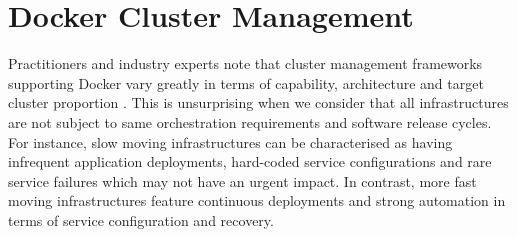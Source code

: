 \documentclass{article}
\begin{document}
\section{Docker Cluster Management}
Practitioners and industry experts note that cluster management frameworks supporting Docker
vary greatly in terms of capability, architecture and target cluster proportion
\citep{goasguen, holla}. This is unsurprising when we consider that all infrastructures 
are not subject to same orchestration requirements and software release cycles.
For instance, slow moving infrastructures can be characterised as having infrequent application deployments,
 hard-coded service configurations and rare service failures which may not have an urgent impact. In contrast, more fast moving infrastructures feature continuous deployments and strong automation in terms of service configuration and recovery. 
\end{document}
